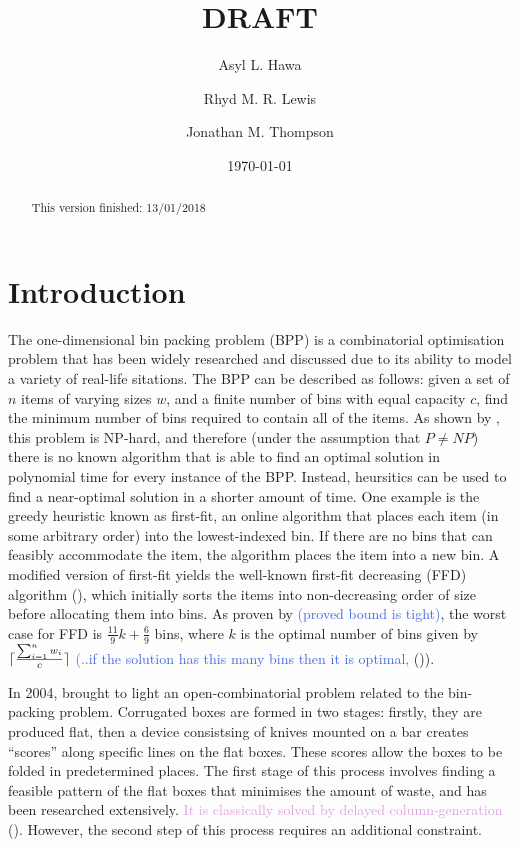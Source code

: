 \documentclass[oribibl]{llncs}
\title{DRAFT}
\author{Asyl L. Hawa \and Rhyd M. R. Lewis \and Jonathan M. Thompson}
\institute{School of Mathematics, Cardiff University, Senghennydd Road, Cardiff, UK, CF24 4AG}
\date{\today}
\begin{document}
\maketitle

\begin{abstract}
	This version finished: 13/01/2018
\end{abstract}


\section{Introduction}
\label{sec:intro}
The one-dimensional bin packing problem (BPP) is a combinatorial optimisation problem that has been widely researched and discussed due to its ability to model a variety of real-life sitations.
The BPP can be described as follows: given a set of $n$ items of varying sizes $w$, and a finite number of bins with equal capacity $c$, find the minimum number of bins required to contain all of the items. As shown by \cite{garey1979}, this problem is NP-hard, and therefore (under the assumption that $P \neq NP$) there is no known algorithm that is able to find an optimal solution in polynomial time for every instance of the BPP. Instead, heursitics can be used to find a near-optimal solution in a shorter amount of time. One example is the greedy heuristic known as first-fit, an online algorithm that places each item (in some arbitrary order) into the lowest-indexed bin. If there are no bins that can feasibly accommodate the item, the algorithm places the item into a new bin. A modified version of first-fit yields the well-known first-fit decreasing (FFD) algorithm (\citealp{eilon1971}), which initially sorts the items into non-decreasing order of size before allocating them into bins. As proven by \cite{dosa2007} \textcolor{RoyalBlue}{(proved bound is tight)}, the worst case for FFD is $\frac{11}{9}k + \frac{6}{9}$ bins, where $k$ is the optimal number of bins given by $\lceil\frac{\sum_{i=1}^{n} w_{i}}{c}\rceil$ \textcolor{RoyalBlue}{(..if the solution has this many bins then it is optimal,} (\citealp{korf2002})).

In 2004, \citeauthor{goulimis2004} brought to light an open-combinatorial problem related to the bin-packing problem. Corrugated boxes are formed in two stages: firstly, they are produced flat, then a device consistsing of knives mounted on a bar creates ``scores'' along specific lines on the flat boxes. These scores allow the boxes to be folded in predetermined places. The first stage of this process involves finding a feasible pattern of the flat boxes that minimises the amount of waste, and has been researched extensively. \textcolor{Plum}{It is classically solved by delayed column-generation} (\citealp{gilmore1961, gilmore1963}). However, the second step of this process requires an additional constraint.
\end{document}
